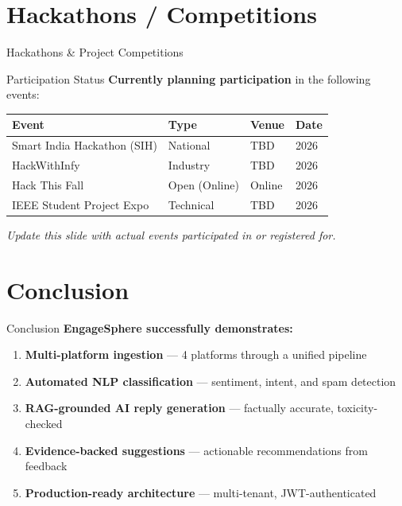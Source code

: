 \documentclass[aspectratio=169]{beamer}
\begin{document}
\section{Hackathons / Competitions}

\begin{frame}{Hackathons \& Project Competitions}
  \begin{block}{Participation Status}
    \textbf{Currently planning participation} in the following events:
  \end{block}
  \vspace{0.3cm}
  \begin{table}
    \small
    \begin{tabular}{@{}llll@{}}
      \toprule
      \textbf{Event} & \textbf{Type} & \textbf{Venue} & \textbf{Date} \\
      \midrule
      Smart India Hackathon (SIH) & National & TBD & 2026 \\
      HackWithInfy & Industry & TBD & 2026 \\
      Hack This Fall & Open (Online) & Online & 2026 \\
      IEEE Student Project Expo & Technical & TBD & 2026 \\
      \bottomrule
    \end{tabular}
  \end{table}
  \vspace{0.3cm}
  \small \textit{Update this slide with actual events participated in or registered for.}
\end{frame}

\section{Conclusion}

\begin{frame}{Conclusion}
  \textbf{EngageSphere successfully demonstrates:}
  \vspace{0.2cm}
  \begin{enumerate}
    \item \textbf{Multi-platform ingestion} — 4 platforms through a unified pipeline
    \item \textbf{Automated NLP classification} — sentiment, intent, and spam detection
    \item \textbf{RAG-grounded AI reply generation} — factually accurate, toxicity-checked
    \item \textbf{Evidence-backed suggestions} — actionable recommendations from feedback
    \item \textbf{Production-ready architecture} — multi-tenant, JWT-authenticated
  \end{enumerate}
\end{frame}
\end{document}
